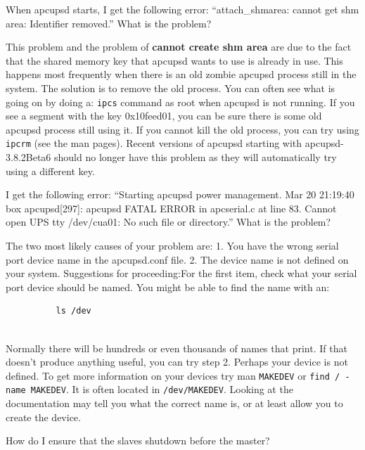 {{{{{{{{\begin{description}
{{{\item [Q:]
   When apcupsd starts, I get the following error: ``attach\_shmarea: cannot get
shm area: Identifier removed.'' What is the problem?  

\item [A:]
   This problem and the problem of {\bf cannot create shm area} are due to the
fact that the shared memory key that apcupsd wants to use is already in use.
This happens most frequently when there is an old zombie apcupsd process still
in the system.  The solution is to remove the old process.  You can often see
what is going on by doing a: {\tt ipcs} command as root when apcupsd is not
running. If you see a segment with the key 0x10feed01, you can be sure there
is some old apcupsd process still using it. If you cannot kill the old
process, you can try using {\tt ipcrm} (see the man pages).  Recent versions
of apcupsd starting with apcupsd-3.8.2Beta6 should no longer have this problem
as they will automatically try using a different key.  

\item [Q:]
   I get the following error: ``Starting apcupsd power management.  Mar 20
21:19:40 box apcupsd[297]: apcupsd FATAL ERROR in apcserial.c at line 83.
Cannot open UPS tty /dev/cua01: No such file or directory.'' What is the
problem?  

\item [A:]
   The two most likely causes of your problem are:  1. You have the wrong serial
port device name in the apcupsd.conf file. 2. The device name is not defined
on your system. Suggestions for proceeding:For the first item, check what your
serial port device should be named. You might be able to find the name with
an:  

\footnotesize
\begin{verbatim}
          ls /dev
     
\end{verbatim}
\normalsize

Normally there will be hundreds or even thousands of names that print. If that
doesn't produce anything useful, you can try step 2.  Perhaps your device is
not defined. To get more information on your devices try man {\tt MAKEDEV} or
{\tt find / -name MAKEDEV}.  It is often located in {\tt /dev/MAKEDEV}. 
Looking at the documentation may tell you what the correct name is, or at
least allow you to create the device.  

\item [Q:]
   How do I ensure that the slaves shutdown before the master?  

}}}
\end{description}}}}}}}}}
